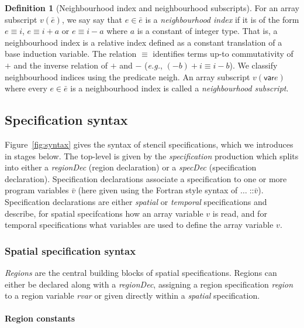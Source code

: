 \documentclass[9pt]{sigplanconf}
\newcounter{block}
\theoremstyle{definition}
\newtheorem{definition}[block]{Definition}
\newcommand{\eg}{\emph{e.g.}}
\newcommand{\nonterm}[1]{\textit{#1}}
\newcommand{\neigh}{\textsf{neigh}}
\newcommand{\var}{\textsf{var}}
\begin{document}
\begin{definition}[Neighbourhood index and neighbourhood subscripts]
  For an array subscript $v(\bar{e})$, we say say that $e \in \bar{e}$
  is a \emph{neighbourhood index} if it is of the form 
  $e \equiv i$, $e \equiv i + a$ or $e \equiv i - a$ where $a$ is a
  constant of integer type. That is, a neighbourhood index is a
  relative index defined as a constant translation of a base induction
  variable. The relation $\equiv$ identifies terms up-to commutativity
  of $+$ and the inverse relation of $+$ and $-$ (\eg{},
  $(-b) + i \equiv i - b$).  We classify neighbourhood indices using
  the predicate \neigh{}. An array subscript $v(\var{e})$ where every
 $e \in \bar{e}$ is a neighbourhood index is called a 
 \emph{neighbourhood subscript}. 
\end{definition}


\subsection{Specification syntax}
\label{sec:syntax}

Figure~\ref{fig:syntax} gives the syntax of stencil specifications,
which we introduces in stages below.  The top-level is given by the
\nonterm{specification} production which splits into either a
\nonterm{regionDec} (region declaration) or a \nonterm{specDec}
(specification declaration). Specification declarations associate a
specification to one or more program variables $\bar{v}$ (here given
using the Fortran style syntax of $\ldots \; \texttt{::} \bar{v}$).
Specification declarations are either \nonterm{spatial} or
\nonterm{temporal} specifications and describe, for spatial
specifcations how an array variable $v$ is read, and for temporal
specifications what variables are used to define the array variable $v$.

\subsubsection{Spatial specification syntax}

\emph{Regions} are the central building blocks of spatial
specifications. Regions can either be declared along with a
\nonterm{regionDec}, assigning a region specification \nonterm{region} to
a region variable \nonterm{rvar} or given directly within a
\nonterm{spatial} specification.

\paragraph{Region constants}
\end{document}
